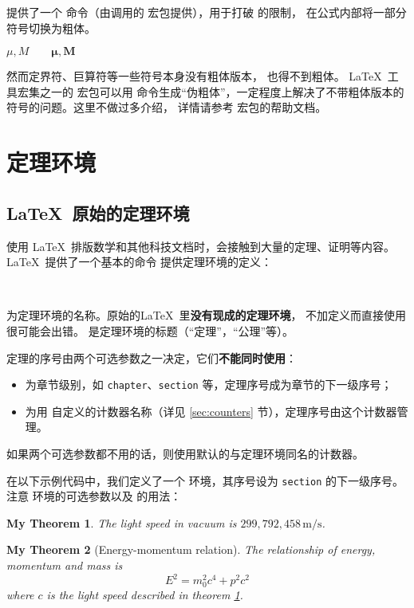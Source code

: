  提供了一个  命令（由调用的  宏包提供），用于打破  的限制，
在公式内部将一部分符号切换为粗体。
\begin{example}
$\mu, M \qquad
\boldsymbol{\mu}, \boldsymbol{M}$
\end{example}

然而定界符、巨算符等一些符号本身没有粗体版本， 也得不到粗体。
\LaTeX\ 工具宏集之一的  宏包可以用  命令生成“伪粗体”，一定程度上解决了不带粗体版本的符号的问题。这里不做过多介绍，
详情请参考  宏包的帮助文档。

\section{定理环境}\label{sec:theorems}

\subsection{\LaTeX\ 原始的定理环境}\label{subsec:latex-theorems}

使用 \LaTeX\ 排版数学和其他科技文档时，会接触到大量的定理、证明等内容。
\LaTeX\ 提供了一个基本的命令  提供定理环境的定义：
\begin{command}
 \\
\end{command}

 为定理环境的名称。原始的\LaTeX\ 里\textbf{没有现成的定理环境}，
不加定义而直接使用很可能会出错。 是定理环境的标题（“定理”，“公理”等）。

定理的序号由两个可选参数之一决定，它们\textbf{不能同时使用}：
\begin{itemize}
  \item {} 为章节级别，如 \texttt{chapter}、\texttt{section} 等，定理序号成为章节的下一级序号；
  \item {} 为用  自定义的计数器名称（详见 \ref{sec:counters} 节），定理序号由这个计数器管理。
\end{itemize}
如果两个可选参数都不用的话，则使用默认的与定理环境同名的计数器。

在以下示例代码中，我们定义了一个  环境，其序号设为 \texttt{section} 的下一级序号。
注意  环境的可选参数以及  的用法：
\begin{example}
\newtheorem{mythm}{My Theorem}[section]
\begin{mythm}\label{thm:light}
The light speed in vacuum
is $299,792,458\,\mathrm{m/s}$.
\end{mythm}
\begin{mythm}[Energy-momentum relation]
The relationship of energy, 
momentum and mass is 
\[E^2 = m_0^2 c^4 + p^2 c^2\]
where $c$ is the light speed 
described in theorem \ref{thm:light}.
\end{mythm}
\end{example}

